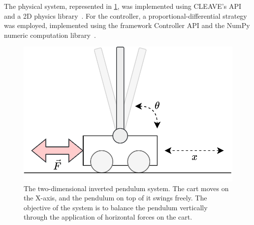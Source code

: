 The physical system, represented in \cref{fig:invpend}, was implemented using CLEAVE's API and a 2D physics library~\autocite{chipmunk2d,pymunk}.
For the controller, a proportional-differential strategy was employed, implemented using the framework Controller API and the NumPy numeric computation library~\autocite{harris2020array}.

\begin{figure}
    \centering
    \includegraphics[width=.95\columnwidth]{images/inverted_pendulum.png}
    \caption{
        The two-dimensional inverted pendulum system.
        The cart moves on the X-axis, and the pendulum on top of it swings freely.
        The objective of the system is to balance the pendulum vertically through the application of horizontal forces on the cart.
    }\label{fig:invpend}
\end{figure}
